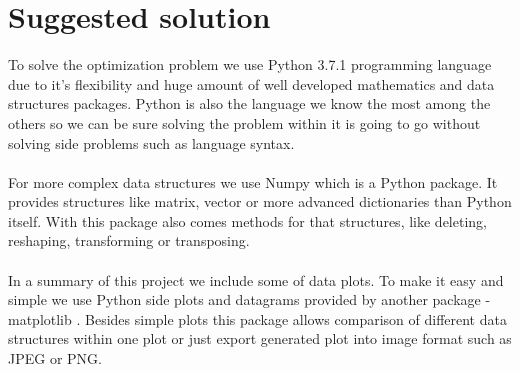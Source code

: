 \documentclass[conference]{IEEEtran}
\begin{document}
\section{Suggested solution}
To solve the optimization problem we use Python 3.7.1 \cite{python} programming language due to it's flexibility and huge amount of well developed mathematics and data structures packages. Python is also the language we know the most among the others so we can be sure solving the problem within it is going to go without solving side problems such as language syntax.
\\ \\
For more complex data structures we use Numpy \cite{numpy} which is a Python package. It provides structures like matrix, vector or more advanced dictionaries than Python itself. With this package also comes methods for that structures, like deleting, reshaping, transforming or transposing.
\\ \\
In a summary of this project we include some of data plots. To make it easy and simple we use Python side plots and datagrams provided by another package - matplotlib \cite{matplotlib}. Besides simple plots this package allows comparison of different data structures within one plot or just export generated plot into image format such as JPEG or PNG.
\end{document}

